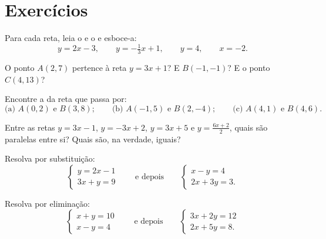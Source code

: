 \section{Exercícios}

\begin{exercise}[$\star$]\label{exo:g10:lines:1}
Para cada reta, leia o  e o  e
esboce-a:
\[
y = 2x - 3, \qquad
y = -\tfrac13 x + 1, \qquad
y = 4, \qquad
x = -2 .
\]
\end{exercise}

\begin{exercise}[$\star$]\label{exo:g10:lines:2}
O ponto $A(2, 7)$ pertence à reta $y = 3x + 1$? E $B(-1, -1)$? E o ponto
$C(4, 13)$?
\end{exercise}

\begin{exercise}[$\star$]\label{exo:g10:lines:3}
Encontre a  da reta que passa por:
\[
\text{(a) } A(0, 2) \text{ e } B(3, 8);
\qquad
\text{(b) } A(-1, 5) \text{ e } B(2, -4);
\qquad
\text{(c) } A(4, 1) \text{ e } B(4, 6).
\]
\end{exercise}

\begin{exercise}[$\star$]\label{exo:g10:lines:4}
Entre as retas $y = 3x - 1$, $y = -3x + 2$, $y = 3x + 5$ e
$y = \frac{6x + 2}{2}$, quais são paralelas entre si? Quais são, na
verdade, iguais?
\end{exercise}

\begin{exercise}[$\star$]\label{exo:g10:lines:5}
Resolva por substituição:
\[
\begin{cases}
y = 2x - 1 \\
3x + y = 9
\end{cases}
\qquad\text{e depois}\qquad
\begin{cases}
x - y = 4 \\
2x + 3y = 3 .
\end{cases}
\]
\end{exercise}

\begin{exercise}[$\star$]\label{exo:g10:lines:6}
Resolva por eliminação:
\[
\begin{cases}
x + y = 10 \\
x - y = 4
\end{cases}
\qquad\text{e depois}\qquad
\begin{cases}
3x + 2y = 12 \\
2x + 5y = 8 .
\end{cases}
\]
\end{exercise}

